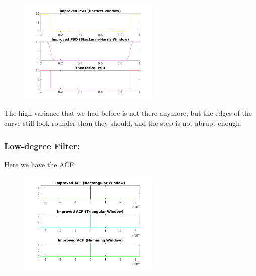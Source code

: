 \documentclass[a4paper,11pt]{article}
\begin{document}
\begin{figure}[!hp]
    \begin{center}
      \includegraphics[width=0.6\textwidth]{images/study2/psd_hd_window2.png}
    \end{center}
\end{figure}

The high variance that we had before is not there anymore, but the edges of the
curve still look rounder than they should, and the step is not abrupt enough.

\newpage

\subsubsection{Low-degree Filter:}

Here we have the ACF:

\begin{figure}[!hp]
    \begin{center}
      \includegraphics[width=0.6\textwidth]{images/study2/acf_ld_plot1.png}
    \end{center}
\end{figure}
\end{document}
